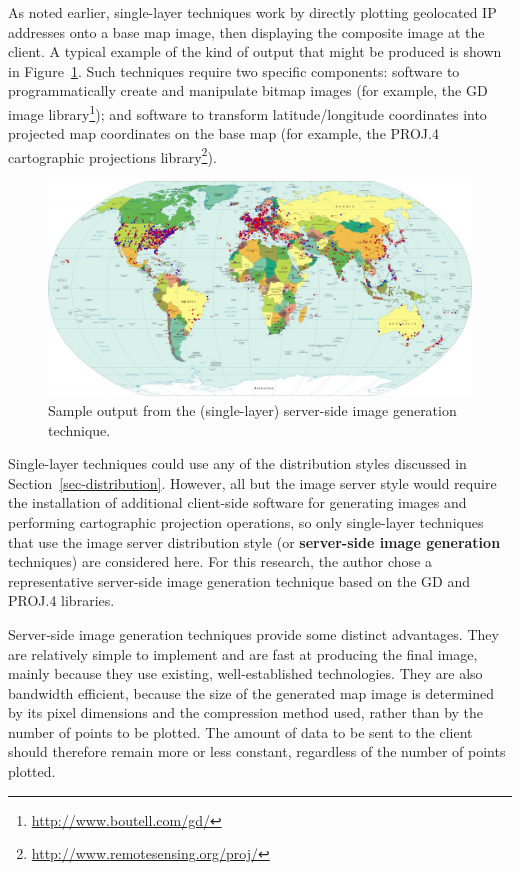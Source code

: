 \documentclass[acmnow]{acmtrans2m}
\begin{document}
As noted earlier, single-layer techniques work by directly plotting
geolocated IP addresses onto a base map image, then displaying the
composite image at the client. A typical example of the kind of output
that might be produced is shown in Figure~\ref{fig-image}. Such
techniques require two specific components: software to programmatically
create and manipulate bitmap images (for example, the GD image
library\footnote{\url{http://www.boutell.com/gd/}}); and software to
transform latitude/longitude coordinates into projected map coordinates
on the base map (for example, the PROJ.4 cartographic projections
library\footnote{\url{http://www.remotesensing.org/proj/}}).


\begin{figure}
	\centering
	\includegraphics[width=\textwidth,keepaspectratio]{ImageGeneration-full}
	\caption{Sample output from the (single-layer) server-side image
		generation technique.}
	\label{fig-image}
\end{figure}


Single-layer techniques could use any of the distribution styles
discussed in Section~\ref{sec-distribution}. However, all but the image
server style would require the installation of additional client-side
software for generating images and performing cartographic projection
operations, so only single-layer techniques that use the image server
distribution style (or \textbf{server-side image generation} techniques)
are considered here. For this research, the author chose a
representative server-side image generation technique based on the GD
and PROJ.4 libraries.

Server-side image generation techniques provide some distinct
advantages. They are relatively simple to implement and are fast at
producing the final image, mainly because they use existing,
well-established technologies. They are also bandwidth efficient,
because the size of the generated map image is determined by its pixel
dimensions and the compression method used, rather than by the number of
points to be plotted. The amount of data to be sent to the client should
therefore remain more or less constant, regardless of the number of
points plotted.
\end{document}
